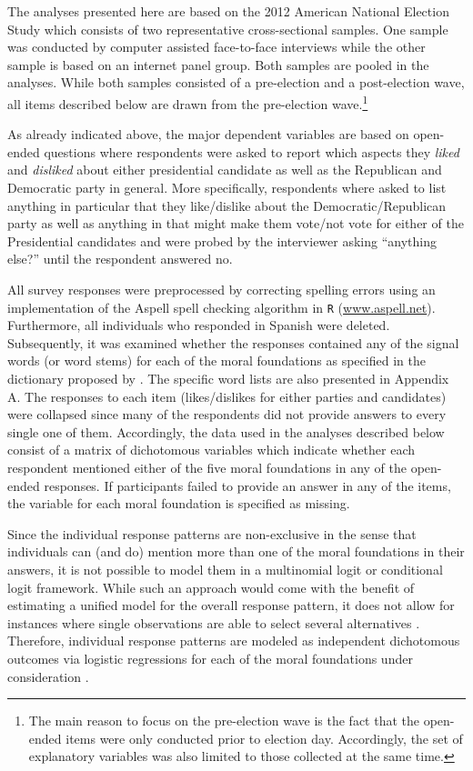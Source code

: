 \documentclass[12pt]{article}
\begin{document}
The analyses presented here are based on the 2012 American National Election Study which consists of two representative cross-sectional samples. One sample was conducted by computer assisted face-to-face interviews while the other sample is based on an internet panel group. Both samples are pooled in the analyses. While both samples consisted of a pre-election and a post-election wave, all items described below are drawn from the pre-election wave.\footnote{The main reason to focus on the pre-election wave is the fact that the open-ended items were only conducted prior to election day. Accordingly, the set of explanatory variables was also limited to those collected at the same time.}

As already indicated above, the major dependent variables are based on open-ended questions where respondents were asked to report which aspects they \textit{liked} and \textit{disliked} about either presidential candidate as well as the Republican and Democratic party in general. More specifically, respondents where asked to list anything in particular that they like/dislike about the Democratic/Republican party as well as anything in that might make them vote/not vote for either of the Presidential candidates and were probed by the interviewer asking ``anything else?'' until the respondent answered no.

All survey responses were preprocessed by correcting spelling errors using an implementation of the Aspell spell checking algorithm in \texttt{R} (\url{www.aspell.net}). Furthermore, all individuals who responded in Spanish were deleted. Subsequently, it was examined whether the responses contained any of the signal words (or word stems) for each of the moral foundations as specified in the dictionary proposed by \citet{graham2009liberals}. The specific word lists are also presented in Appendix A. The responses to each item (likes/dislikes for either parties and candidates) were collapsed since many of the respondents did not provide answers to every single one of them. Accordingly, the data used in the analyses described below consist of a matrix of dichotomous variables which indicate whether each respondent mentioned either of the five moral foundations in any of the open-ended responses. If participants failed to provide an answer in any of the items, the variable for each moral foundation is specified as missing.

Since the individual response patterns are non-exclusive in the sense that individuals can (and do) mention more than one of the moral foundations in their answers, it is not possible to model them in a multinomial logit or conditional logit framework. While such an approach would come with the benefit of estimating a unified model for the overall response pattern, it does not allow for instances where single observations are able to select several alternatives \citep[but see][]{gilbert2007models}. Therefore, individual response patterns are modeled as independent dichotomous outcomes via logistic regressions for each of the moral foundations under consideration \citep[c.f. for example][]{agresti1999modeling}.
\end{document}
